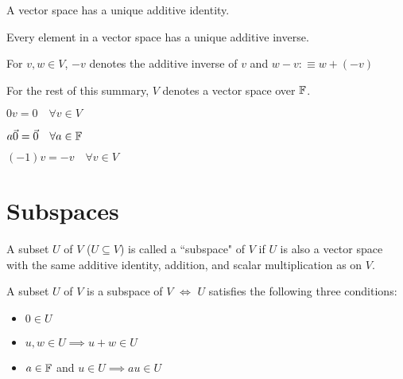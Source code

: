 \setcounter{thm}{25}
\begin{thm}
    A vector space has a unique additive identity.
\end{thm}

\begin{thm}
    Every element in a vector space has a unique additive inverse.
\end{thm}

\begin{mydef}
    For $v,w\in V$, $-v$ denotes the additive inverse of $v$ and $w-v:\equiv w+(-v)$
\end{mydef}

\begin{mydef}
    For the rest of this summary, $V$ denotes a vector space over $\mathbb{F}$.
\end{mydef}

\begin{thm}
    $0v = 0 \quad \forall v\in V$
\end{thm}

\begin{thm}
    $a \vec0= \vec0 \quad \forall a\in \mathbb{F}$
\end{thm}

\begin{thm}
    $(-1)v = -v \quad \forall v\in V$
\end{thm}

\filbreak
\section{Subspaces}

\begin{mydef}
    A subset $U$ of $V$ ($U \subseteq V$) is called a ``subspace" of $V$ if $U$ is also a vector space with the same additive identity, addition, and scalar multiplication as on $V$.
\end{mydef}

\begin{thm}
    A subset $U$ of $V$ is a subspace of $V$ $\iff$ $U$ satisfies the following three conditions:
    \begin{itemize}
        \item {} 
        $0 \in U$
        \item {} 
        $u,w \in U \implies u+w \in U$
        \item {} 
        $a \in \mathbb{F}$ and $u \in U \implies au \in U$
    \end{itemize}
\end{thm}


